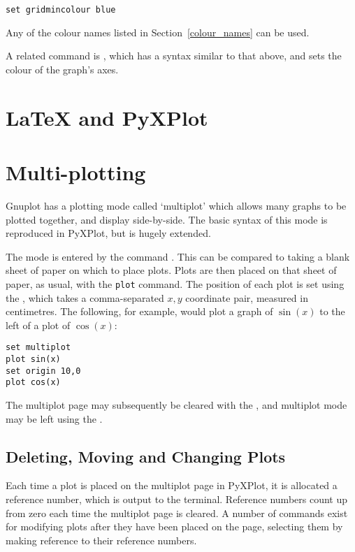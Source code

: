 \begin{verbatim}
set gridmincolour blue
\end{verbatim}

\noindent Any of the colour names listed in Section~\ref{colour_names} can be
used.

A related command is , which has a syntax similar to that above, and sets the colour of
the graph's axes.\label{set_colours}

\section{LaTeX and PyXPlot}

\section{Multi-plotting}
\label{multiplot}

Gnuplot has a plotting mode called `multiplot' which allows many graphs to be
plotted together, and display side-by-side. The basic syntax of this mode is
reproduced in PyXPlot, but is hugely extended.

The mode is entered by the command .  This can be
compared to taking a blank sheet of paper on which to place plots.  Plots are
then placed on that sheet of paper, as usual, with the {\tt plot} command. The
position of each plot is set using the , which takes a
comma-separated $x,y$ coordinate pair, measured in centimetres. The following,
for example, would plot a graph of $\sin(x)$ to the left of a plot of
$\cos(x)$:

\begin{verbatim} 
set multiplot
plot sin(x)
set origin 10,0
plot cos(x)
\end{verbatim}

The multiplot page may subsequently be cleared with the , and
multiplot mode may be left using the .

\subsection{Deleting, Moving and Changing Plots}

Each time a plot is placed on the multiplot page in PyXPlot, it is allocated a
reference number, which is output to the terminal. Reference numbers count up
from zero each time the multiplot page is cleared. A number of commands exist
for modifying plots after they have been placed on the page, selecting them by
making reference to their reference numbers.

